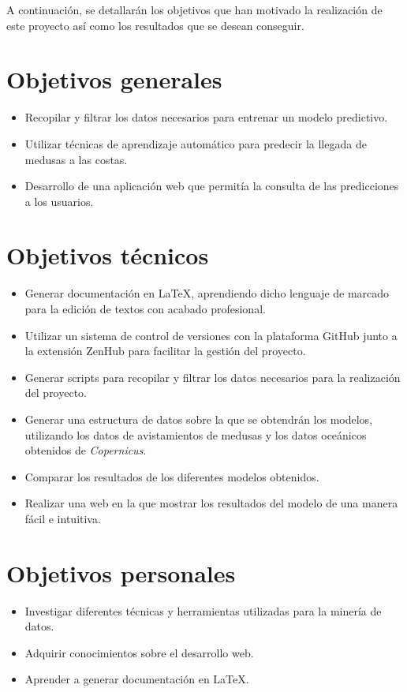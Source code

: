 

A continuación, se detallarán los objetivos que han motivado la realización de este proyecto así como los resultados que se desean conseguir.

\section{Objetivos generales}
\begin{itemize}
	
	\item Recopilar y filtrar los datos necesarios para entrenar un modelo predictivo.
	\item Utilizar técnicas de aprendizaje automático para predecir la llegada de medusas a las costas.
	\item Desarrollo de una aplicación web que permitía la consulta de las predicciones a los usuarios.
\end{itemize}

\section{Objetivos técnicos}
\begin{itemize}
	\item Generar documentación en \LaTeX, aprendiendo dicho lenguaje de marcado para la edición de textos con acabado profesional.
	\item Utilizar un sistema de control de versiones con la plataforma GitHub junto a la extensión ZenHub para facilitar la gestión del proyecto.
	\item Generar scripts para recopilar y filtrar los datos necesarios para la realización del proyecto.
	\item Generar una estructura de datos sobre la que se obtendrán los modelos, utilizando los datos de avistamientos de medusas y los datos oceánicos obtenidos de \emph{Copernicus}.
	\item Comparar los resultados de los diferentes modelos obtenidos.	
	\item Realizar una web en la que mostrar los resultados del modelo de una manera fácil e intuitiva.
\end{itemize}

\section{Objetivos personales}
\begin{itemize}
	\item Investigar diferentes técnicas y herramientas utilizadas para la minería de datos.
	\item Adquirir conocimientos sobre el desarrollo web.
	\item Aprender a generar documentación en \LaTeX.
	
\end{itemize}